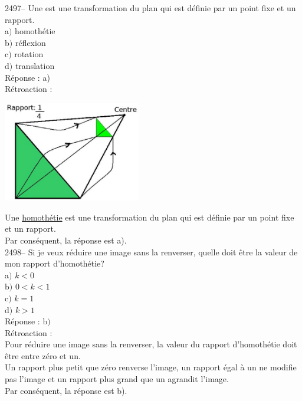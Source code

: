 \documentclass[letterpaper, 12pt]{article}
\begin{document}
2497-- Une \underline{\qquad\qquad} est une transformation du plan qui est d\'efinie par un point fixe et un rapport. \\

a$)$ homoth\'etie\\
b$)$ r\'eflexion\\
c$)$ rotation\\
d$)$ translation\\

R\'eponse : a)\\

R\'etroaction :\\
\begin{center}
 \includegraphics[width=6cm,bb=14 14 516 392]{Q2497.eps}
\end{center}
Une \underline{homoth\'etie} est une transformation du plan qui est d\'efinie par un point fixe et un rapport. \\
Par cons\'equent, la r\'eponse est a).\\

2498-- Si je veux r\'eduire une image sans la renverser, quelle doit \^etre la valeur de mon rapport d'homoth\'etie?\\

a$)$ $k<0$\\
b$)$ $0<k<1$\\
c$)$ $k=1$\\
d$)$ $k>1$\\

R\'eponse : b$)$\\

R\'etroaction :\\
Pour r\'eduire une image sans la renverser, la valeur du rapport d'homoth\'etie doit \^etre entre z\'ero et un. \\
Un rapport plus petit que z\'ero renverse l'image, un rapport \'egal \`a un ne modifie pas l'image et un rapport plus grand que un agrandit l'image.\\
Par cons\'equent, la r\'eponse est b).\\
\end{document}
